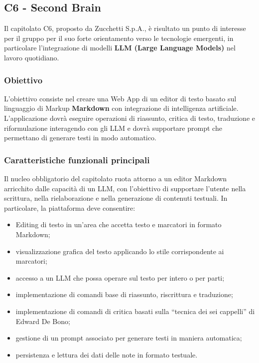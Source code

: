 \documentclass[a4paper,12pt]{article}
\begin{document}
\subsection{C6 - Second Brain}

Il capitolato C6, proposto da Zucchetti S.p.A., è risultato un punto di interesse per il gruppo per il suo forte orientamento verso le tecnologie emergenti, in particolare l’integrazione di modelli \textbf{LLM (Large Language Models)} nel lavoro quotidiano.

\subsubsection{Obiettivo}

L’obiettivo consiste nel creare una Web App di un editor di testo basato sul linguaggio di Markup \textbf{Markdown} con integrazione di intelligenza artificiale. L’applicazione dovrà eseguire operazioni di riassunto, critica di testo, traduzione e riformulazione interagendo con gli LLM e dovrà supportare prompt che permettano di generare testi in modo automatico.

\subsubsection{Caratteristiche funzionali principali}

Il nucleo obbligatorio del capitolato ruota attorno a un editor Markdown arricchito dalle capacità di un LLM, con l'obiettivo di supportare l'utente nella scrittura, nella rielaborazione e nella generazione di contenuti testuali. In particolare, la piattaforma deve consentire:

\begin{itemize}
    \item Editing di testo in un'area che accetta testo e marcatori in formato Markdown;
    \item visualizzazione grafica del testo applicando lo stile corrispondente ai marcatori;
    \item accesso a un LLM che possa operare sul testo per intero o per parti;
    \item implementazione di comandi base di riassunto, riscrittura e traduzione;
    \item implementazione di comandi di critica basati sulla ``tecnica dei sei cappelli'' di Edward De Bono;
    \item gestione di un prompt associato per generare testi in maniera automatica;
    \item persistenza e lettura dei dati delle note in formato testuale.
\end{itemize}
\end{document}
